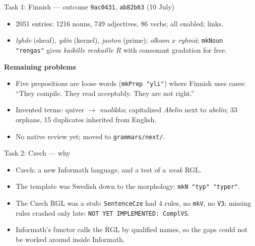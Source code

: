 \documentclass[10pt,aspectratio=169]{beamer}
\newcommand{\bad}[1]{\textcolor{warn}{#1}}
\newcommand{\ok}[1]{\textcolor{good}{#1}}
\newcommand{\commit}[1]{\texttt{\footnotesize #1}}
\begin{document}
\begin{frame}{Task 1: Finnish --- outcome}
  \commit{9ac0431}, \commit{ab82b63} (10 July)
  \begin{itemize}
    \item 2051 entries: 1216 nouns, 749 adjectives, 86 verbs; all enabled; links.
    \item \ok{\emph{lyhde}} (sheaf), \ok{\emph{ydin}} (kernel), \ok{\emph{jaoton}} (prime);
          \emph{olkoon $x$ ryhmä}; \texttt{mkNoun "rengas"} gives
          \emph{kaikille renkaille $R$} with consonant gradation for free.
  \end{itemize}
  \textbf{Remaining problems}
  \begin{itemize}\small
    \item Five prepositions are loose words (\texttt{mkPrep "yli"}) where Finnish uses cases:
          ``They compile. They read acceptably. They are not right.''
    \item Invented terms: \bad{quiver $\to$ \emph{nuolikko}}; capitalized
          \emph{Abelin} next to \emph{abelin}; 33 orphans, 15 duplicates inherited from English.
    \item No native review yet; moved to \texttt{grammars/next/}.
  \end{itemize}
\end{frame}

\begin{frame}{Task 2: Czech --- why}
  \begin{itemize}
    \item Czech: a new Informath language, and a test of a \emph{weak} RGL.
    \item The template was Swedish down to the morphology:
          \texttt{mkN "typ" "typer"}.
    \item The Czech RGL was a stub: \texttt{SentenceCze} had 4 rules,
          no \texttt{mkV}, no \texttt{V3}; missing rules crashed only late:
          \texttt{NOT YET IMPLEMENTED: ComplVS}.
    \item Informath's functor calls the RGL by qualified names, so the gaps
          could not be worked around inside Informath.
  \end{itemize}
\end{frame}
\end{document}
